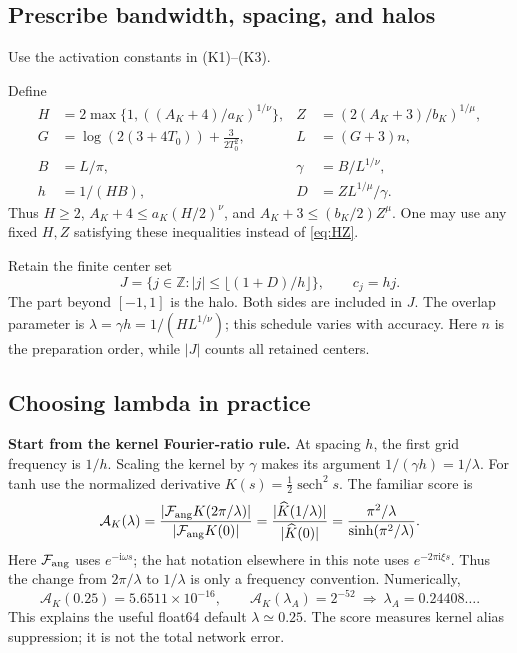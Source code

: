 \documentclass[11pt,letterpaper]{article}
\newcommand{\Z}{\mathbb Z}
\newcommand{\ii}{\mathrm i}
\theoremstyle{definition}
\theoremstyle{remark}
\begin{document}
\subsection{Prescribe bandwidth, spacing, and halos}\label{sec:bandwidth}
Use the activation constants in (K1)--(K3).

Define
\begin{align}
 H&=2\max\{1,((A_K+4)/a_K)^{1/\nu}\},&
 Z&=(2(A_K+3)/b_K)^{1/\mu},\label{eq:HZ}\\
 G&=\log(2(3+4T_0))+\frac{3}{2T_0^2},&
 L&=(G+3)n,\label{eq:L}\\
 B&=L/\pi,&
 \gamma&=B/L^{1/\nu},\label{eq:bandwidth}\\
 h&=1/(HB),&
 D&=ZL^{1/\mu}/\gamma.\label{eq:halo}
\end{align}
Thus \(H\ge2\), \(A_K+4\le a_K(H/2)^\nu\), and
\(A_K+3\le (b_K/2)Z^\mu\). One may use any fixed \(H,Z\) satisfying these
inequalities instead of \eqref{eq:HZ}.

Retain the finite center set
\[
 J=\{j\in\Z:|j|\le\lfloor(1+D)/h\rfloor\},\qquad c_j=hj.
\]
The part beyond \([-1,1]\) is the halo. Both sides are included in \(J\).
The overlap parameter is \(\lambda=\gamma h=1/(HL^{1/\nu})\); this schedule
varies with accuracy. Here \(n\) is the preparation order, while \(|J|\)
counts all retained centers.

\subsection{Choosing lambda in practice}\label{sec:lambda-choice}
\textbf{Start from the kernel Fourier-ratio rule.} At spacing \(h\), the
first grid frequency is \(1/h\). Scaling the kernel by \(\gamma\) makes its
argument \(1/(\gamma h)=1/\lambda\). For tanh use the normalized derivative
\(K(s)=\tfrac12\operatorname{sech}^2s\). The familiar score is
\begin{equation}\label{eq:lambda-kernel-ratio}
 \mathcal A_K(\lambda)
 =\frac{|\mathcal F_{\rm ang}K(2\pi/\lambda)|}{|\mathcal F_{\rm ang}K(0)|}
 =\frac{|\widehat K(1/\lambda)|}{|\widehat K(0)|}
 =\frac{\pi^2/\lambda}{\sinh(\pi^2/\lambda)}.
\end{equation}
Here \(\mathcal F_{\rm ang}\) uses \(e^{-\ii\omega s}\); the hat notation
elsewhere in this note uses \(e^{-2\pi\ii\xi s}\).
Thus the change from \(2\pi/\lambda\) to \(1/\lambda\) is only a frequency
convention. Numerically,
\[
 \mathcal A_K(0.25)=5.6511\times10^{-16},\qquad
 \mathcal A_K(\lambda_A)=2^{-52}\ \Longrightarrow\ \lambda_A=0.24408\ldots.
\]
This explains the useful float64 default \(\lambda\simeq0.25\).
The score measures kernel alias suppression; it is not the total network error.
\end{document}
